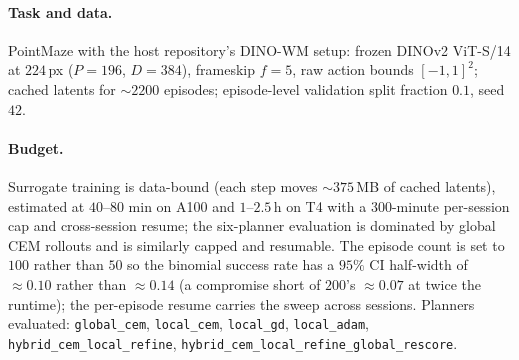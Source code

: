 \documentclass[11pt,a4paper]{article}
\begin{document}
\paragraph{Task and data.} PointMaze with the host repository's DINO-WM
setup: frozen DINOv2 ViT-S/14 at $224$\,px ($P{=}196$, $D{=}384$), frameskip
$f{=}5$, raw action bounds $[-1,1]^2$; cached latents for ${\sim}2200$
episodes; episode-level validation split fraction $0.1$, seed $42$.

\begin{table}[h]
\centering
\small
{}
\caption{Full-experiment configuration (\texttt{pointmaze\_surrogate\_a100.yaml};
the T4 profile differs only in rollout chunk size and dataloader workers).}
\label{tab:config}
\end{table}

\paragraph{Budget.} Surrogate training is data-bound (each step moves
${\sim}375$\,MB of cached latents), estimated at $40$--$80$ min on A100 and
$1$--$2.5$\,h on T4 with a $300$-minute per-session cap and cross-session
resume; the six-planner evaluation is dominated by global CEM rollouts and is
similarly capped and resumable. The episode count is set to $100$ rather than
$50$ so the binomial success rate has a $95\%$ CI half-width of
${\approx}0.10$ rather than ${\approx}0.14$ (a compromise short of $200$'s
${\approx}0.07$ at twice the runtime); the per-episode resume carries the
sweep across sessions. Planners evaluated:
\texttt{global\_cem}, \texttt{local\_cem}, \texttt{local\_gd},
\texttt{local\_adam}, \texttt{hybrid\_cem\_local\_refine},
\texttt{hybrid\_cem\_local\_refine\_global\_rescore}.
\end{document}
